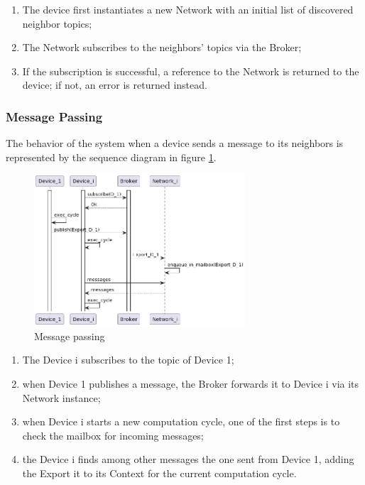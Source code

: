 \begin{enumerate}
    \item The device first instantiates a new Network with an initial list of discovered neighbor topics;
    \item The Network subscribes to the neighbors' topics via the Broker;
    \item If the subscription is successful, a reference to the Network is returned to the device; if not, an error is returned instead.
\end{enumerate}

\subsubsection{Message Passing}
The behavior of the system when a device sends a message to its neighbors is represented by the sequence diagram in figure \ref{fig:message-passing}.

\begin{figure}[ht!]
    \centering
    \includegraphics[width=0.7\textwidth]{figures/diagrams/img/activity-message-passing.png}
    \caption{Message passing}
    \label{fig:message-passing}
\end{figure}

\begin{enumerate}
    \item The Device i subscribes to the topic of Device 1;
    \item when Device 1 publishes a message, the Broker forwards it to Device i via its Network instance;
    \item when Device i starts a new computation cycle, one of the first steps is to check the mailbox for incoming messages;
    \item the Device i finds among other messages the one sent from Device 1, adding the Export it to its Context for the current computation cycle.
\end{enumerate}
